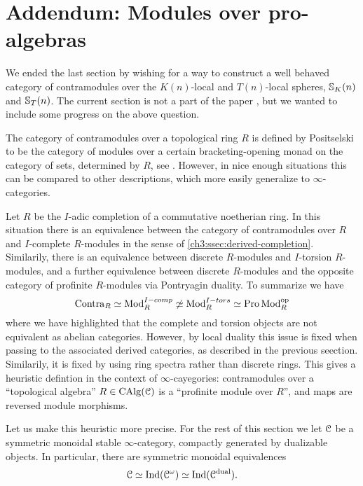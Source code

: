 
\section{Addendum: Modules over pro-algebras}

We ended the last section by wishing for a way to construct a well behaved category of contramodules over the $K(n)$-local and $T(n)$-local spheres, $\mathbb{S}_K(n)$ and $\mathbb{S}_T(n)$. The current section is not a part of the paper \cite{aambo_2024_positselski}, but we wanted to include some progress on the above question. 

The category of contramodules over a topological ring $R$ is defined by Positselski to be the category of modules over a certain bracketing-opening monad on the category of sets, determined by $R$, see \cite{positselski_2022_contramodules}. However, in nice enough situations this can be compared to other descriptions, which more easily generalize to $\infty$-categories. 

\begin{remark}
    \label{ch3:rm:contra-as-op-pro-modules}
    Let $R$ be the $I$-adic completion of a commutative noetherian ring. In this situation there is an equivalence between the category of contramodules over $R$ and $I$-complete $R$-modules in the sense of \cref{ch3:ssec:derived-completion}. Similarily, there is an equivalence between discrete $R$-modules and $I$-torsion $R$-modules, and a further equivalence between discrete $R$-modules and the opposite category of profinite $R$-modules via Pontryagin duality. To summarize we have  
    \[\mathrm{Contra}_R \simeq \mathrm{Mod}_R^{I-comp} \not\simeq \mathrm{Mod}_R^{I-tors}\simeq \operatorname{Pro}\mathrm{Mod}_R^{\mathrm{op}}\]
    where we have highlighted that the complete and torsion objects are not equivalent as abelian categories. However, by local duality this issue is fixed when passing to the associated derived categories, as described in the previous seection. Similarily, it is fixed by using ring spectra rather than discrete rings. This gives a heuristic defintion in the context of $\infty$-cayegories: contramodules over a ``topological algebra'' $R\in \operatorname{CAlg}(\EuScript{C})$ is a ``profinite module over $R$'', and maps are reversed module morphisms.  
\end{remark}

Let us make this heuristic more precise. For the rest of this section we let $\EuScript{C}$ be a symmetric monoidal stable $\infty$-category, compactly generated by dualizable objects. In particular, there are symmetric monoidal equivalences 
\[\EuScript{C} \simeq \operatorname{Ind}(\EuScript{C}^\omega) \simeq \operatorname{Ind}(\EuScript{C}^{\mathrm{dual}}).\]

